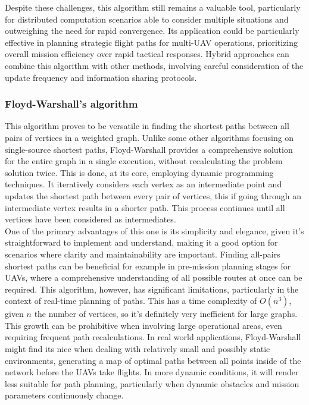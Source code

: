 \documentclass[conference]{IEEEtran}
\begin{document}
Despite these challenges, this algorithm still remains a valuable tool, particularly for distributed computation scenarios able to consider multiple situations and outweighing the need for rapid convergence. Its application could be particularly effective in planning strategic flight paths for multi-UAV operations, prioritizing overall mission efficiency over rapid tactical responses. Hybrid approaches can combine this algorithm with other methods, involving careful consideration of the update frequency and information sharing protocols. \\

\subsubsection{Floyd-Warshall’s algorithm}

This algorithm proves to be versatile in finding the shortest paths between all pairs of vertices in a weighted graph. Unlike some other algorithms focusing on single-source shortest paths, Floyd-Warshall provides a comprehensive solution for the entire graph in a single execution, without recalculating the problem solution twice. This is done, at its core, employing dynamic programming techniques. It iteratively considers each vertex as an intermediate point and updates the shortest path between every pair of vertices, this if going through an intermediate vertex results in a shorter path. This process continues until all vertices have been considered as intermediates. \\

One of the primary advantages of this one is its simplicity and elegance, given it's straightforward to implement and understand, making it a good option for scenarios where clarity and maintainability are important. Finding all-pairs shortest paths can be beneficial for example in pre-mission planning stages for UAVs, where a comprehensive understanding of all possible routes at once can be required. This algorithm, however, has significant limitations, particularly in the context of real-time planning of paths. This has a time complexity of $O(n^3)$, given $n$ the number of vertices, so it's definitely very inefficient for large graphs. This growth can be prohibitive when involving large operational areas, even requiring frequent path recalculations. In real world applications, Floyd-Warshall might find its nice when dealing with relatively small and possibly static environments, generating a map of optimal paths between all points inside of the network before the UAVs take flights. In more dynamic conditions, it will render less suitable for path planning, particularly when dynamic obstacles and mission parameters continuously change. \\
\end{document}
